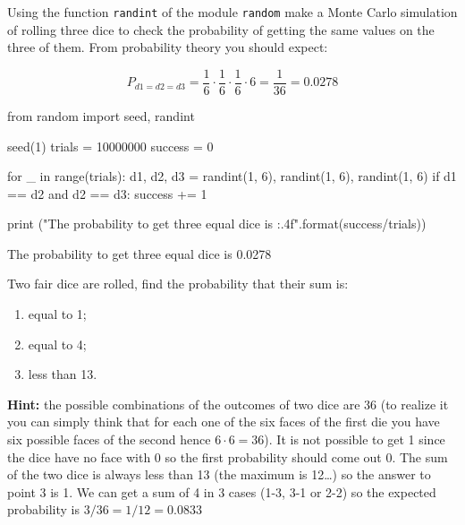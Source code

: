 \cprotEnv\begin{question}
Using the function \texttt{randint} of the module \texttt{random} make a Monte Carlo simulation of rolling three dice to check the probability of getting the same values on the three of them.
From probability theory you should expect:

\begin{equation*}
P_{d1=d2=d3} = \frac{1}{6}\cdot\frac{1}{6}\cdot\frac{1}{6}\cdot 6 = \frac{1}{36} = 0.0278
\end{equation*}
\end{question}

\cprotEnv\begin{solution}
\begin{ipython}
from random import seed, randint

seed(1)
trials = 10000000
success = 0

for _ in range(trials):
    d1, d2, d3 = randint(1, 6), randint(1, 6), randint(1, 6)
    if d1 == d2 and d2 == d3:
        success += 1

print ("The probability to get three equal dice is {:.4f}".format(success/trials))
\end{ipython}
\begin{ioutput}
The probability to get three equal dice is 0.0278
\end{ioutput}
\end{solution}

\begin{question}
Two fair dice are rolled, find the probability that their sum is:
\begin{enumerate}[start=1]
\item equal to 1;
\item equal to 4;
\item less than 13.
\end{enumerate}
	
\noindent\textbf{Hint:} the possible combinations of the outcomes of two dice are 36 (to realize it you can simply think that for each one of the six faces of the first die you have six possible faces of the second hence $6\cdot 6=36$). It is not possible to get 1 since the dice have no face with 0 so the first probability should come out 0. The sum of the two dice is always less than 13 (the maximum is 12\ldots) so the answer to point 3 is 1. We can get a sum of 4 in 3 cases (1-3, 3-1 or 2-2) so the expected probability is $3/36=1/12=0.0833$
\end{question}

